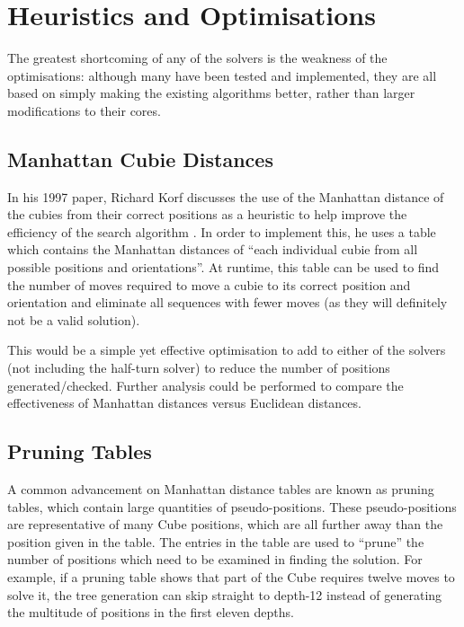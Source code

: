 \documentclass{report}
\newcommand{\depth}[1]{depth-#1}
\begin{document}
	\section{Heuristics and Optimisations}
	
	The greatest shortcoming of any of the solvers is the weakness of the optimisations: although many have been tested and implemented, they are all based on simply making the existing algorithms better, rather than larger modifications to their cores.
	
	\subsection{Manhattan Cubie Distances}

	In his 1997 paper, Richard Korf discusses the use of the Manhattan distance of the cubies from their correct positions as a heuristic to help improve the efficiency of the search algorithm \cite{Korf1997}. In order to implement this, he uses a table which contains the Manhattan distances of \enquote{each individual cubie from all possible positions and orientations}. At runtime, this table can be used to find the number of moves required to move a cubie to its correct position and orientation and eliminate all sequences with fewer moves (as they will definitely not be a valid solution).
	
	This would be a simple yet effective optimisation to add to either of the solvers (not including the half-turn solver) to reduce the number of positions generated/checked. Further analysis could be performed to compare the effectiveness of Manhattan distances versus Euclidean distances.

	\subsection{Pruning Tables}
        
	A common advancement on Manhattan distance tables are known as pruning tables, which contain large quantities of pseudo-positions. These pseudo-positions are representative of many Cube positions, which are all further away than the position given in the table. The entries in the table are used to \enquote{prune} the number of positions which need to be examined in finding the solution. For example, if a pruning table shows that part of the Cube requires twelve moves to solve it, the tree generation can skip straight to \depth{12} instead of generating the multitude of positions in the first eleven depths.
	
\end{document}
